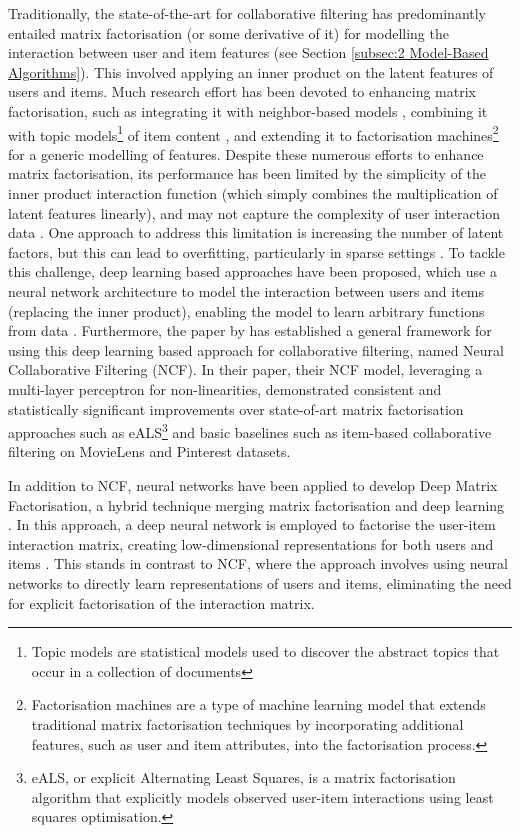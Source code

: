 Traditionally, the state-of-the-art for collaborative filtering has predominantly entailed matrix factorisation (or some derivative of it) for modelling the interaction between user and item features (see Section \ref{subsec:2 Model-Based Algorithms}). This involved applying an inner product on the latent features of users and items. Much research effort has been devoted to enhancing matrix factorisation, such as integrating it with neighbor-based models \cite{koren2008factorization}, combining it with topic models\footnote{Topic models are statistical models used to discover the abstract topics that occur in a collection of documents} of item content \cite{wang2015collaborative}, and extending it to factorisation machines\footnote{Factorisation machines are a type of machine learning model that extends traditional matrix factorisation techniques by incorporating additional features, such as user and item attributes, into the factorisation process.} \cite{rendle2010factorization} for a generic modelling of features. Despite these numerous efforts to enhance matrix factorisation, its performance has been limited by the simplicity of the inner product interaction function (which simply combines the multiplication of latent features linearly), and may not capture the complexity of user interaction data \cite{he2017neural}. One approach to address this limitation is increasing the number of latent factors, but this can lead to overfitting, particularly in sparse settings \cite{rendle2010factorization}. To tackle this challenge, deep learning based approaches have  been proposed, which use a neural network architecture to model the interaction between users and items (replacing the inner product), enabling the model to learn arbitrary functions from data \cite{he2017neural}. Furthermore, the paper by \cite{he2017neural} has established a general framework for using this deep learning based approach for collaborative filtering, named Neural Collaborative Filtering (NCF). In their paper, their NCF model, leveraging a multi-layer perceptron for non-linearities, demonstrated consistent and statistically significant improvements over state-of-art matrix factorisation approaches such as eALS\footnote{eALS, or explicit Alternating Least Squares, is a matrix factorisation algorithm that explicitly models observed user-item interactions using least squares optimisation.} and basic baselines such as item-based collaborative filtering on MovieLens and Pinterest datasets. 

In addition to NCF, neural networks have been applied to develop Deep Matrix Factorisation, a hybrid technique merging matrix factorisation and deep learning \cite{zhang2019deep}. In this approach, a deep neural network is employed to factorise the user-item interaction matrix, creating low-dimensional representations for both users and items \cite{zhang2019deep}. This stands in contrast to NCF, where the approach involves using neural networks to directly learn representations of users and items, eliminating the need for explicit factorisation of the interaction matrix. 

